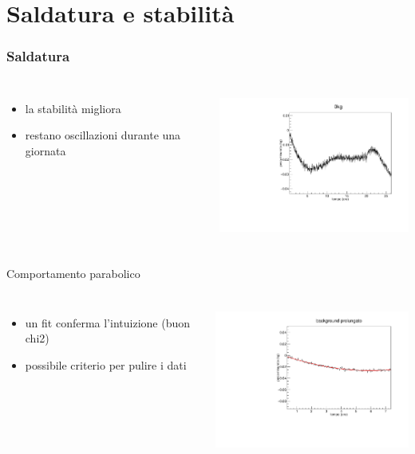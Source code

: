 \documentclass{beamer}
\begin{document}
\section{Saldatura e stabilit\`a}
\begin{frame}
  \frametitle{Saldatura}
  \begin{columns}[c] 
      \begin{itemize}
        \item la stabilit\`a migliora
        \item restano oscillazioni durante una giornata
      \end{itemize}
      \includegraphics[height=5cm]{../../analisi_dati/background/0kg_24h}   
  \end{columns}
\end{frame}
\begin{frame}{Comportamento parabolico}
  \begin{columns}[c] 
      \begin{itemize}
        \item un fit conferma l'intuizione (buon chi2)
        \item possibile criterio per pulire i dati
      \end{itemize}
      \includegraphics[height=5cm]{../../analisi_dati/background/0kg_parabola}   
  \end{columns}
\end{frame}
\end{document}
